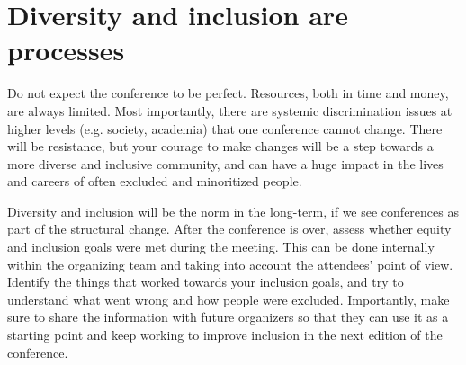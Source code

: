 \documentclass[10pt,letterpaper]{article}
\begin{document}
\section{Diversity and inclusion are processes}
\label{rule_process}

Do not expect the conference to be perfect. 
Resources, both in time and money, are always limited. 
Most importantly, there are systemic discrimination issues at higher levels (e.g. society, academia) that one conference cannot change. 
There will be resistance, but your courage to make changes will be a step towards a more diverse and inclusive community, and can have a huge impact in the lives and careers of often excluded and minoritized people.

Diversity and inclusion will be the norm in the long-term, if we see conferences as part of the structural change. 
After the conference is over, assess whether equity and inclusion goals were met during the meeting. 
This can be done internally within the organizing team and taking into account the attendees' point of view. 
Identify the things that worked towards your inclusion goals, and try to understand what went wrong and how people were excluded.
Importantly, make sure to share the information with future organizers so that they can use it as a starting point and keep working to improve inclusion in the next edition of the conference. 

\end{document}
